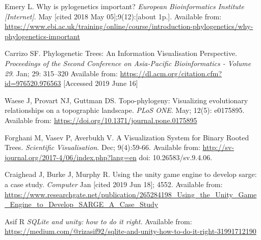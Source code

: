 \documentclass[10pt,letterpaper]{article}
\begin{document}
\begin{thebibliography}{10}

Emery L.
\newblock Why is pylogenetics important?
\newblock \textit{European Bioinformatics Institute [Internet]}. 
 May [cited 2018 May 05];9(12):[about 1p.].
\newblock Available from: \href{https://www.ebi.ac.uk/training/online/course/introduction-phylogenetics/why-phylogenetics-important}{https://www.ebi.ac.uk/training/online/course/introduction-phylogenetics/why-phylogenetics-important}

Carrizo SF.
\newblock Phylogenetic Trees: An Information Visualisation Perspective.
\newblock \textit{Proceedings of the Second Conference on Asia-Pacific Bioinformatics - Volume 29}. 
 Jan; 29: 315–320 
\newblock Available from: \href{https://dl.acm.org/citation.cfm?id=976520.976563}{https://dl.acm.org/citation.cfm?id=976520.976563} [Accessed 2019 June 16]

Waese J, Provart NJ, Guttman DS.
\newblock Topo-phylogeny: Visualizing evolutionary relationships on a topographic landscape.
\newblock \textit{PLoS ONE}.
 May; 12(5): e0175895. Available from: \href{https://doi.org/10.1371/journal.pone.0175895}{https://doi.org/10.1371/journal.pone.0175895}

Forghani M, Vasev P, Averbukh V.
\newblock A Visualization System for Binary Rooted Trees.
\newblock \textit{Scientific Visualisation}. 
 Dec; 9(4):59-66. Available from: \href{http://sv-journal.org/2017-4/06/index.php?lang=en}{http://sv-journal.org/2017-4/06/index.php?lang=en}
\newblock doi: 10.26583/sv.9.4.06.

Craighead J, Burke J, Murphy R.
\newblock Using the unity game engine to develop sarge: a case study.
\newblock \textit{Computer}
 Jan [cited 2019 Jun 18]; 4552. 
\newblock Available from: \href{https://www.researchgate.net/publication/265284198\_Using\_the\_Unity\_Game\_Engine\_to\_Develop\_SARGE\_A\_Case\_Study}{https://www.researchgate.net/publication/265284198\_Using\_the\_Unity\_Game\_Engine\_to\_Develop\_SARGE\_A\_Case\_Study}

Asif R 
\newblock \textit{SQLite and unity: how to do it right.}
\newblock Available from: \href{https://medium.com/@rizasif92/sqlite-and-unity-how-to-do-it-right-31991712190}{https://medium.com/@rizasif92/sqlite-and-unity-how-to-do-it-right-31991712190}

\end{thebibliography}
\end{document}
